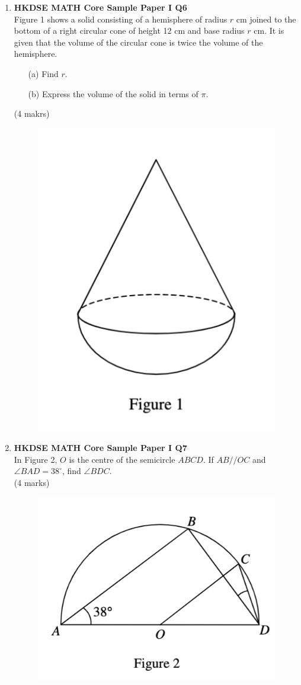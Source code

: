 \documentclass[12pt]{article}
\begin{document}
\begin{enumerate}
	\item \textbf{HKDSE MATH Core Sample Paper I Q6}\\
	Figure 1 shows a solid consisting of a hemisphere of radius $r$ cm joined to the bottom of a right circular cone of height 12 cm and base radius $r$ cm. It is given that the volume of the circular cone is twice the volume of the hemisphere.
	\begin{enumerate}
		\item[(a)] Find $r$.
		\item[(b)] Express the volume of the solid in terms of $\pi$.
	\end{enumerate}
	(4 makrs)
	\begin{figure}[H]
		\centering
		\includegraphics[width = .5\linewidth]{SPFigure1.1}
	\end{figure}

	\item \textbf{HKDSE MATH Core Sample Paper I Q7}\\
	In Figure 2, $O$ is the centre of the semicircle $ABCD$. If $AB//OC$ and $\angle BAD = 38^\circ$, find $\angle BDC$. \\(4 marks)
	\begin{figure}[H]
		\centering
		\includegraphics[width = .5\linewidth]{SPFigure1.2}
	\end{figure}


\end{enumerate}
\end{document}

